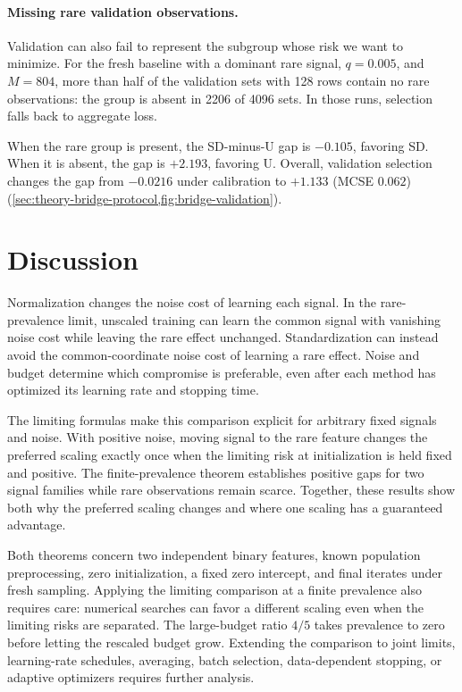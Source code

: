 \documentclass{alt2027}
\begin{document}
\paragraph{Missing rare validation observations.}

Validation can also fail to represent the subgroup whose risk we want to
minimize. For the fresh baseline with a dominant rare signal, $q = 0.005$, and
$M = 804$, more than half of the validation sets with 128 rows contain no rare
observations: the group is absent in 2206 of 4096 sets. In those runs, selection
falls back to aggregate loss.

When the rare group is present, the SD-minus-U gap is $-0.105$, favoring SD.
When it is absent, the gap is $+2.193$, favoring U. Overall, validation
selection changes the gap from $-0.0216$ under calibration to $+1.133$ (MCSE
$0.062$) (\cref{sec:theory-bridge-protocol,fig:bridge-validation}).

\section{Discussion}

Normalization changes the noise cost of learning each signal. In the
rare-prevalence limit, unscaled training can learn the common signal with
vanishing noise cost while leaving the rare effect unchanged. Standardization
can instead avoid the common-coordinate noise cost of learning a rare effect.
Noise and budget determine which compromise is preferable, even after each
method has optimized its learning rate and stopping time.

The limiting formulas make this comparison explicit for arbitrary fixed signals
and noise. With positive noise, moving signal to the rare feature changes the
preferred scaling exactly once when the limiting risk at initialization is held
fixed and positive. The finite-prevalence theorem establishes positive gaps for
two signal families while rare observations remain scarce. Together, these
results show both why the preferred scaling changes and where one scaling has a
guaranteed advantage.

Both theorems concern two independent binary features, known population
preprocessing, zero initialization, a fixed zero intercept, and final iterates
under fresh sampling. Applying the limiting comparison at a finite prevalence
also requires care: numerical searches can favor a different scaling even when
the limiting risks are separated. The large-budget ratio $4/5$ takes prevalence
to zero before letting the rescaled budget grow. Extending the comparison to
joint limits, learning-rate schedules, averaging, batch selection,
data-dependent stopping, or adaptive optimizers requires further analysis.
\end{document}

